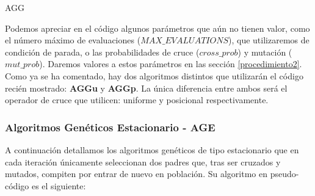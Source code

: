 \documentclass[11pt,a4paper]{article}
\begin{document}
	\begin{algorithm}[H]
	\caption{AGG}
	\end{algorithm}

	Podemos apreciar en el código algunos parámetros que aún no tienen valor, como el número máximo de evaluaciones ($MAX\_EVALUATIONS$), que utilizaremos de condición de parada, o las probabilidades de cruce ($cross\_prob$) y mutación ($mut\_prob$). Daremos valores a estos parámetros en las sección \ref{procedimiento2}. \\
	
	Como ya se ha comentado, hay dos algoritmos distintos que utilizarán el código recién mostrado: \textbf{AGGu} y \textbf{AGGp}. La única diferencia entre ambos será el operador de cruce que utilicen: uniforme y posicional respectivamente.

	\subsubsection{ Algoritmos Genéticos Estacionario - AGE }	

	A continuación detallamos los algoritmos genéticos de tipo estacionario que en cada iteración únicamente seleccionan dos padres que, tras ser cruzados y mutados, compiten por entrar de nuevo en población. Su algoritmo en pseudo-código es el siguiente:
\end{document}
